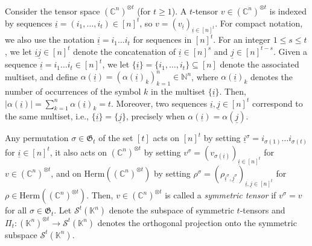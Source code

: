 \documentclass[11pt]{article}
\newcommand{\N}{\ensuremath{\mathbb{N}}}   %
\newcommand{\K}{\ensuremath{\mathbb{K}}}   %
\newcommand{\C}{\ensuremath{\mathbb{C}}} %
\newcommand{\Perm}{\mathfrak G}
\newcommand{\MS}{{\mathcal S}}
\newcommand{\Herm}{\mathrm{Herm}}
\newcommand{\Cnt}{(\C^n)^{\ot t}}
\newcommand{\ot}{\otimes}
\newcommand{\ui}{\underline{i}}
\newcommand{\uj}{\underline{j}}
\theoremstyle{plain}
\newcommand{\ML}{\textcolor{blue}}
\begin{document}
  
\smallskip
Consider the tensor   space $\Cnt$ (for   $t\ge 1$). 
A $t$-tensor $v\in \Cnt$ is indexed by sequences $\ui=(i_1,\ldots,i_t)\in [n]^t$, so $v=(v_{\ui})_{\ui\in [n]^t}$. For  compact notation, we also use the notation $\ui=i_1\ldots i_t$ for sequences in $[n]^t$. 
For an integer $1\le s\le t$, we let $\ui \uj\in [n]^t$ denote the concatenation of   $\ui\in [n]^s$ and $\uj\in [n]^{t-s}$. 
Given a sequence   $\ui=i_1\ldots i_t \in[n]^t$, we let $\{\ui\}=\{i_1,\ldots,i_t\}\subseteq [n]$ denote the associated multiset, and define $\alpha(\ui)=(\alpha(\ui)_k)_{k=1}^n\in \N^n$, where $\alpha(\ui)_k$ denotes the number of occurrences of the symbol $k$ in the multiset $\{\ui\}$. Then, $|\alpha(\ui)|=\sum_{k=1}^n \alpha(\ui)_k=t$. Moreover, two sequences $\ui,\uj\in[n]^t$ correspond to the same multiset, i.e., $\{\ui\}=\{\uj\}$, precisely when $\alpha(\ui)=\alpha(\uj)$.

\smallskip
Any permutation $\sigma\in \Perm_t$ of the set $[t]$  acts on $[n]^t$ by setting
 $\ui^\sigma=i_{\sigma(1)}\ldots i_{\sigma(t)}$ for $\ui\in[n]^t$,  it also acts on $\Cnt$ by setting $v^\sigma= (v_{\sigma(\ui)})_{\ui\in [n]^t}$ for $v\in\Cnt$, and on $\Herm((\C^n)^{\ot t})$ by setting 
 $\rho^\sigma= (\rho_{\ui^\sigma,\uj^\sigma})_{\ui,\uj\in[n]^t}$ for $\rho\in \Herm((\C^n)^{\ot t})$.
Then, $v\in\Cnt$ is called a {\em symmetric tensor} if $v^\sigma=v$ for all $\sigma\in\Perm_t$.
Let $\MS^t(\K^n)$ denote the subspace of symmetric $t$-tensors and 
$\Pi_t: (\K^n)^{\ot t} \to \MS^t(\K^n)$ denotes the orthogonal projection onto the symmetric subspace $\MS^t(\K^n)$.
\end{document}
